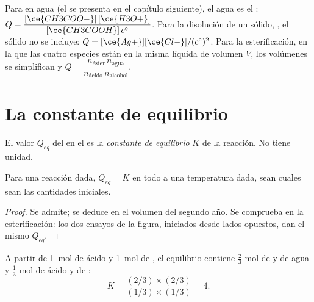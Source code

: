 \begin{example}\label{ex:g12:equilibrium:quotients}
Para  en agua (el   se
presenta en el capítulo siguiente), el agua es el :
$Q = \dfrac{[\ce{CH3COO-}]\,[\ce{H3O+}]}{[\ce{CH3COOH}]\,c^\circ}$. Para
la disolución de un sólido, , el sólido no se
incluye: $Q = [\ce{Ag+}][\ce{Cl-}]/(c^\circ)^2$. Para la esterificación,
en la que las cuatro especies están en la misma  líquida de
volumen $V$, los volúmenes se simplifican y $Q = \dfrac{n_{\text{éster}}\, n_{\text{agua}}}{n_{\text{ácido}}\, n_{\text{alcohol}}}$.
\end{example}

\section{La constante de equilibrio}

\begin{definition}\label{def:g12:equilibrium:constant}
El valor $Q_{eq}$ del  en el  es
la \emph{constante de equilibrio} $K$ de
la reacción. No tiene unidad.
\end{definition}

\begin{proposition}\label{prop:g12:equilibrium:constant}
Para una reacción dada, $Q_{eq} = K$ en todo  a una
temperatura dada, sean cuales sean las cantidades iniciales.
\end{proposition}

\begin{proof}
Se admite; se deduce en el volumen del segundo año. Se comprueba en la
esterificación: los dos ensayos de la figura, iniciados desde lados
opuestos, dan el mismo $Q_{eq}$.
\end{proof}

\begin{example}[La $K$ de la esterificación]\label{ex:g12:equilibrium:k-ester}
A partir de \qty{1}{mol} de ácido y \qty{1}{mol} de , el
equilibrio contiene $\frac{2}{3}$ mol de  y de agua y $\frac{1}{3}$
mol de ácido y de :
\[
  K = \frac{(2/3)\times(2/3)}{(1/3)\times(1/3)} = 4 .
\]
\end{example}

